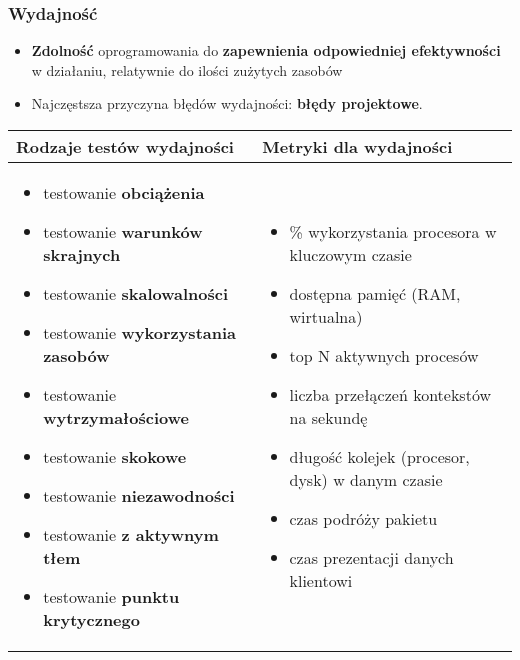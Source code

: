 \documentclass[../main.tex]{subfiles}
\begin{document}
    \subsubsection{Wydajność}
    \begin{itemize}
        \item \textbf{Zdolność} oprogramowania do \textbf{zapewnienia odpowiedniej efektywności} w działaniu, relatywnie do
        ilości zużytych zasobów
        \item Najczęstsza przyczyna błędów wydajności: \textbf{błędy projektowe}.
    \end{itemize}


    \begin{table}[H]
        \begin{center}
            \begin{tabular}{ p{8cm} | p{8cm} }
                \textbf{Rodzaje testów} wydajności & \textbf{Metryki} dla wydajności \\
                \hline
                \begin{itemize}
                    \item testowanie \textbf{obciążenia}
                    \item testowanie \textbf{warunków skrajnych}
                    \item testowanie \textbf{skalowalności}
                    \item testowanie \textbf{wykorzystania zasobów}
                    \item testowanie \textbf{wytrzymałościowe}
                    \item testowanie \textbf{skokowe}
                    \item testowanie \textbf{niezawodności}
                    \item testowanie \textbf{z aktywnym tłem}
                    \item testowanie \textbf{punktu krytycznego}
                \end{itemize}
                &
                \begin{itemize}
                    \item \% wykorzystania procesora w kluczowym czasie
                    \item dostępna pamięć (RAM, wirtualna)
                    \item top N aktywnych procesów
                    \item liczba przełączeń kontekstów na sekundę
                    \item długość kolejek (procesor, dysk) w danym czasie
                    \item czas podróży pakietu
                    \item czas prezentacji danych klientowi
                \end{itemize} \\
            \end{tabular}
        \end{center}
    \end{table}
\end{document}
